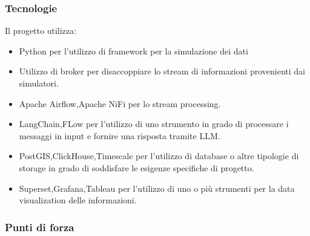     \subsubsection{Tecnologie}
    Il progetto utilizza:
    \begin{itemize}
        \item Python per l'utilizzo di framework per la simulazione dei dati
        \item Utilizzo di broker per disaccoppiare lo stream di informazioni provenienti dai simulatori.
        \item Apache Airflow,Apache NiFi per lo stream processing.
        \item LangChain,FLow per l'utilizzo di uno strumento in grado di processare i messaggi in input e fornire una risposta tramite LLM.
        \item PostGIS,ClickHouse,Timescale per l'utilizzo di database o altre tipologie di storage in grado di soddisfare le esigenze specifiche di progetto. 
        \item Superset,Grafana,Tableau per l'utilizzo di uno o più strumenti per la data visualization delle informazioni.
    \end{itemize}

    \subsubsection{Punti di forza}

